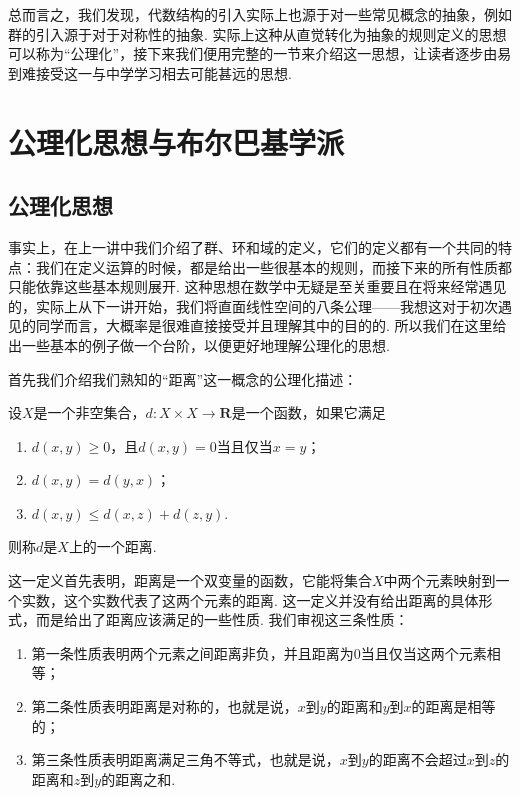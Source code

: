 总而言之，我们发现，代数结构的引入实际上也源于对一些常见概念的抽象，例如群的引入源于对于对称性的抽象. 实际上这种从直觉转化为抽象的规则定义的思想可以称为``公理化''，接下来我们便用完整的一节来介绍这一思想，让读者逐步由易到难接受这一与中学学习相去可能甚远的思想.

\section{公理化思想与布尔巴基学派}

\subsection{公理化思想}

事实上，在上一讲中我们介绍了群、环和域的定义，它们的定义都有一个共同的特点：我们在定义运算的时候，都是给出一些很基本的规则，而接下来的所有性质都只能依靠这些基本规则展开. 这种思想在数学中无疑是至关重要且在将来经常遇见的，实际上从下一讲开始，我们将直面线性空间的八条公理——我想这对于初次遇见的同学而言，大概率是很难直接接受并且理解其中的目的的. 所以我们在这里给出一些基本的例子做一个台阶，以便更好地理解公理化的思想.

首先我们介绍我们熟知的``距离''这一概念的公理化描述：
\begin{definition}
    设$X$是一个非空集合，$d:X\times X\to \mathbf{R}$是一个函数，如果它满足
    \begin{enumerate}
        \item $d(x,y)\geqslant 0$，且$d(x,y)=0$当且仅当$x=y$；

        \item $d(x,y)=d(y,x)$；

        \item $d(x,y)\leqslant d(x,z)+d(z,y)$.
    \end{enumerate}
    则称$d$是$X$上的一个距离.
\end{definition}

这一定义首先表明，距离是一个双变量的函数，它能将集合$X$中两个元素映射到一个实数，这个实数代表了这两个元素的距离. 这一定义并没有给出距离的具体形式，而是给出了距离应该满足的一些性质. 我们审视这三条性质：
\begin{enumerate}
    \item 第一条性质表明两个元素之间距离非负，并且距离为0当且仅当这两个元素相等；

    \item 第二条性质表明距离是对称的，也就是说，$x$到$y$的距离和$y$到$x$的距离是相等的；

    \item 第三条性质表明距离满足三角不等式，也就是说，$x$到$y$的距离不会超过$x$到$z$的距离和$z$到$y$的距离之和.
\end{enumerate}


